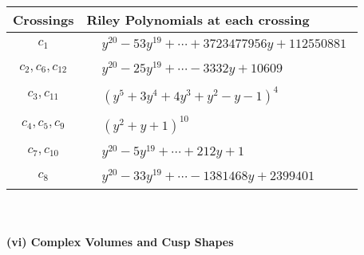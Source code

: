 \documentclass[1p]{elsarticle_modified}
\theoremstyle{definition}
\begin{document}
\begin{tabular}{m{50pt}|m{274pt}}
Crossings & \hspace{64pt}Riley Polynomials at each crossing \\
\hline $$\begin{aligned}c_{1}\end{aligned}$$&$\begin{aligned}
&y^{20}-53 y^{19}+\cdots+3723477956 y+112550881
\end{aligned}$\\
\hline $$\begin{aligned}c_{2},c_{6},c_{12}\end{aligned}$$&$\begin{aligned}
&y^{20}-25 y^{19}+\cdots-3332 y+10609
\end{aligned}$\\
\hline $$\begin{aligned}c_{3},c_{11}\end{aligned}$$&$\begin{aligned}
&(y^5+3 y^4+4 y^3+y^2- y-1)^4
\end{aligned}$\\
\hline $$\begin{aligned}c_{4},c_{5},c_{9}\end{aligned}$$&$\begin{aligned}
&(y^2+y+1)^{10}
\end{aligned}$\\
\hline $$\begin{aligned}c_{7},c_{10}\end{aligned}$$&$\begin{aligned}
&y^{20}-5 y^{19}+\cdots+212 y+1
\end{aligned}$\\
\hline $$\begin{aligned}c_{8}\end{aligned}$$&$\begin{aligned}
&y^{20}-33 y^{19}+\cdots-1381468 y+2399401
\end{aligned}$\\
\hline
\end{tabular}\\~\\
\newpage\flushleft \textbf{(vi) Complex Volumes and Cusp Shapes}
\end{document}
